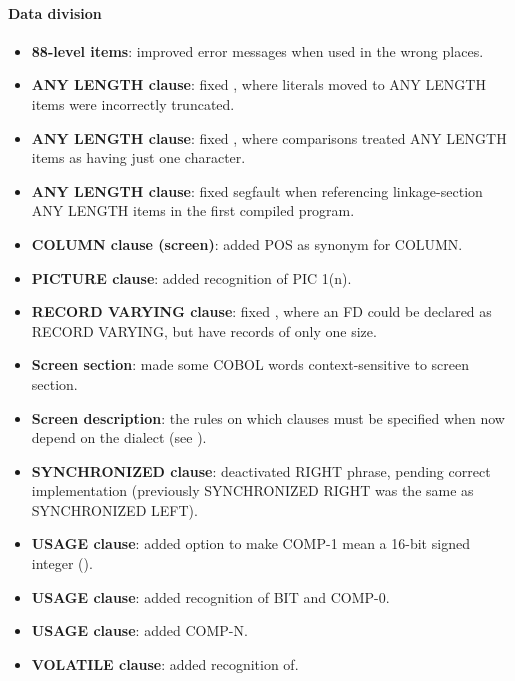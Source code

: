 \paragraph{Data division}
\begin{itemize}
\item \textbf{88-level items}: improved error messages when used in the wrong places.
\item \textbf{ANY LENGTH clause}: fixed , where literals moved to ANY LENGTH items were incorrectly truncated.
\item \textbf{ANY LENGTH clause}: fixed , where comparisons treated ANY LENGTH items as having just one character.
\item \textbf{ANY LENGTH clause}: fixed segfault when referencing linkage-section ANY LENGTH items in the first compiled program.
\item \textbf{COLUMN clause (screen)}: added POS as synonym for COLUMN.
\item \textbf{PICTURE clause}: added recognition of PIC 1(n).
\item \textbf{RECORD VARYING clause}: fixed , where an FD could be declared as RECORD VARYING, but have records of only one size.
\item \textbf{Screen section}: made some COBOL words context-sensitive to screen section.
\item \textbf{Screen description}: the rules on which clauses must be specified when now depend on the dialect (see ).
\item \textbf{SYNCHRONIZED clause}: deactivated RIGHT phrase, pending correct implementation (previously SYNCHRONIZED RIGHT was the same as SYNCHRONIZED LEFT).
\item \textbf{USAGE clause}: added option to make COMP-1 mean a 16-bit signed integer ().
\item \textbf{USAGE clause}: added recognition of BIT and COMP-0.
\item \textbf{USAGE clause}: added COMP-N.
\item \textbf{VOLATILE clause}: added recognition of.
\end{itemize}

